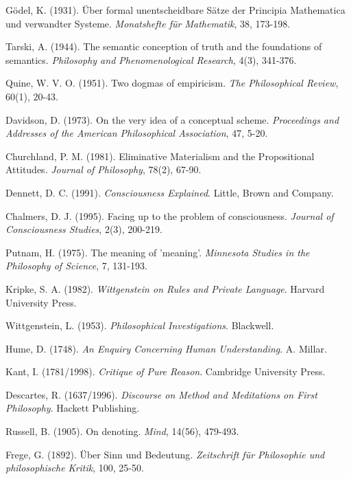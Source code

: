 \documentclass[12pt,a4paper]{article}
\begin{document}

\begin{thebibliography}{99}

Gödel, K. (1931). Über formal unentscheidbare Sätze der Principia Mathematica und verwandter Systeme. \textit{Monatshefte für Mathematik}, 38, 173-198.

Tarski, A. (1944). The semantic conception of truth and the foundations of semantics. \textit{Philosophy and Phenomenological Research}, 4(3), 341-376.

Quine, W. V. O. (1951). Two dogmas of empiricism. \textit{The Philosophical Review}, 60(1), 20-43.

Davidson, D. (1973). On the very idea of a conceptual scheme. \textit{Proceedings and Addresses of the American Philosophical Association}, 47, 5-20.

Churchland, P. M. (1981). Eliminative Materialism and the Propositional Attitudes. \textit{Journal of Philosophy}, 78(2), 67-90.

Dennett, D. C. (1991). \textit{Consciousness Explained}. Little, Brown and Company.

Chalmers, D. J. (1995). Facing up to the problem of consciousness. \textit{Journal of Consciousness Studies}, 2(3), 200-219.

Putnam, H. (1975). The meaning of 'meaning'. \textit{Minnesota Studies in the Philosophy of Science}, 7, 131-193.

Kripke, S. A. (1982). \textit{Wittgenstein on Rules and Private Language}. Harvard University Press.

Wittgenstein, L. (1953). \textit{Philosophical Investigations}. Blackwell.

Hume, D. (1748). \textit{An Enquiry Concerning Human Understanding}. A. Millar.

Kant, I. (1781/1998). \textit{Critique of Pure Reason}. Cambridge University Press.

Descartes, R. (1637/1996). \textit{Discourse on Method and Meditations on First Philosophy}. Hackett Publishing.

Russell, B. (1905). On denoting. \textit{Mind}, 14(56), 479-493.

Frege, G. (1892). Über Sinn und Bedeutung. \textit{Zeitschrift für Philosophie und philosophische Kritik}, 100, 25-50.


\end{thebibliography}
\end{document}
